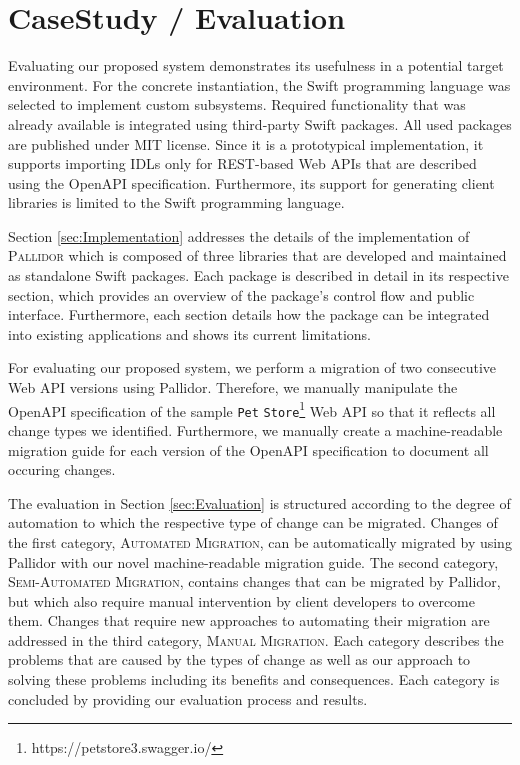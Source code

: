 \chapter{CaseStudy / Evaluation}
\label{ch:CaseStudyEvaluation}

Evaluating our proposed system demonstrates its usefulness in a potential target environment. For the concrete instantiation, the Swift programming language was selected to implement custom subsystems. Required functionality that was already available is integrated using third-party Swift packages. All used packages are published under MIT license. Since it is a prototypical implementation, it supports importing IDLs only for REST-based Web APIs that are described using the OpenAPI specification. Furthermore, its support for generating client libraries is limited to the Swift programming language. 

Section \ref{sec:Implementation} addresses the details of the implementation of \textsc{Pallidor} which is composed of three libraries that are developed and maintained as standalone Swift packages. Each package is described in detail in its respective section, which provides an overview of the package's control flow and public interface. Furthermore, each section details how the package can be integrated into existing applications and shows its current limitations.


For evaluating our proposed system, we perform a migration of two consecutive Web API versions using Pallidor. Therefore, we manually manipulate the Open\-API specification of the sample \texttt{Pet} \texttt{Store}\footnote{https://petstore3.swagger.io/} Web API so that it reflects all change types we identified. Furthermore, we manually create a machine-readable migration guide for each version of the Open\-API specification to document all occuring changes. 

The evaluation in Section \ref{sec:Evaluation} is structured according to the degree of automation to which the respective type of change can be migrated. Changes of the first category, \textsc{Automated Migration}, can be automatically migrated by using Pallidor with our novel machine-readable migration guide. The second category, \textsc{Semi-Automated Migration}, contains changes that can be migrated by Pallidor, but which also require manual intervention by client developers to overcome them. Changes that require new approaches to automating their migration are addressed in the third category, \textsc{Manual Migration}. Each category describes the problems that are caused by the types of change as well as our approach to solving these problems including its benefits and consequences. Each category is concluded by providing our evaluation process and results.

\newpage

\newpage
